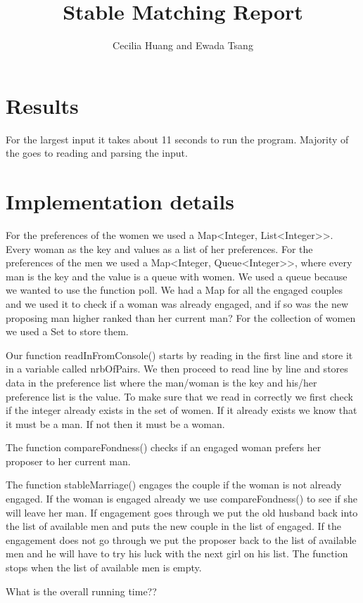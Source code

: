\documentclass{article}
\title{Stable Matching Report}
\author{Cecilia Huang and Ewada Tsang}
\begin{document}
  \maketitle

  \section{Results}

    For the largest input it takes about 11 seconds to run the program. Majority of the goes to reading and parsing the input.
  
  \section{Implementation details}

    For the preferences of the women we used a Map<Integer, List<Integer>>. Every woman as the key and values as a list of her preferences.
    For the preferences of the men we used a Map<Integer, Queue<Integer>>, where every man is the key and the value is a queue with women.
    We used a queue because we wanted to use the function poll.
    We had a Map for all the engaged couples and we used it to check if a woman was already engaged, and if so was the new proposing man higher ranked than her current man?
    For the collection of women we used a Set to store them.

    Our function readInFromConsole() starts by reading in the first line and store it in a variable called nrbOfPairs. We then proceed to read line by line
    and stores data in the preference list where the man/woman is the key and his/her preference list is the value. To make sure that we read in correctly we first
    check if the integer already exists in the set of women. If it already exists we know that it must be a man. If not then it must be a woman.

    The function compareFondness() checks if an engaged woman prefers her proposer to her current man.

    The function stableMarriage() engages the couple if the woman is not already engaged.
    If the woman is engaged already we use compareFondness() to see if she will leave her man.
    If engagement goes through we put the old husband back into the list of available men and puts the new couple in the list of engaged.
    If the engagement does not go through we put the proposer back to the list of available men and he will have to try his luck with the next girl on his list.
    The function stops when the list of available men is empty.

    What is the overall running time??
\end{document}
